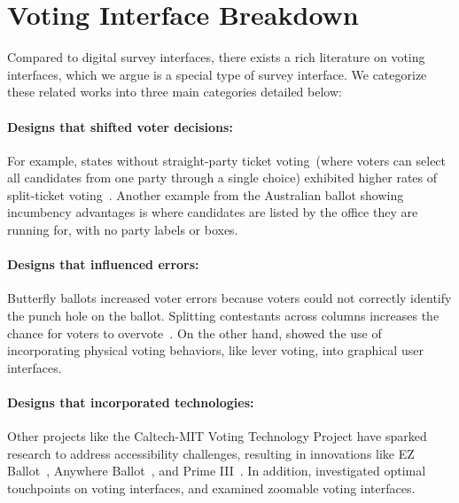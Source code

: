 \appendix

\section{Voting Interface Breakdown}\label{apdx:relatedVoting}
Compared to digital survey interfaces, there exists a rich literature on voting interfaces, which we argue is a special type of survey interface. We categorize these related works into three main categories detailed below:

\paragraph{Designs that shifted voter decisions: } For example, states without straight-party ticket voting~(where voters can select all candidates from one party through a single choice) exhibited higher rates of split-ticket voting~\cite{engstrom2020politics}. Another example from the Australian ballot showing incumbency advantages is where candidates are listed by the office they are running for, with no party labels or boxes.
\paragraph{Designs that influenced errors: } Butterfly ballots increased voter errors because voters could not correctly identify the punch hole on the ballot. Splitting contestants across columns increases the chance for voters to overvote~\cite{quesenberyOpinionGoodDesign2020}. On the other hand, \textcite{everettElectronicVotingMachines2008} showed the use of incorporating physical voting behaviors, like lever voting, into graphical user interfaces.

\paragraph{Designs that incorporated technologies: } Other projects like the Caltech-MIT Voting Technology Project have sparked research to address accessibility challenges, resulting in innovations like EZ Ballot~\cite{leeUniversalDesignBallot2016}, Anywhere Ballot~\cite{summers2014making}, and Prime III~\cite{dawkinsPrimeIIIInnovative2009}. In addition, \textcite{gilbertAnomalyDetectionElectronic2013} investigated optimal touchpoints on voting interfaces, and \textcite{conradElectronicVotingEliminates2009} examined zoomable voting interfaces.

